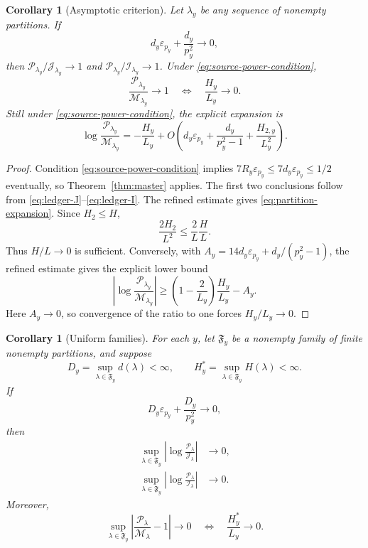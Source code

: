 \documentclass[11pt]{article}
\newtheorem{corollary}[theorem]{Corollary}
\theoremstyle{definition}
\theoremstyle{remark}
\newcommand{\eps}{\varepsilon}
\newcommand{\cP}{\mathcal P}
\newcommand{\cJ}{\mathcal J}
\newcommand{\cI}{\mathcal I}
\newcommand{\cM}{\mathcal M}
\begin{document}
\begin{corollary}[Asymptotic criterion]
\label{cor:criterion}
Let $\lambda_y$ be any sequence of nonempty partitions.  If
\begin{equation}
 d_y\eps_{p_y}+\frac{d_y}{p_y^2}\longrightarrow0,
 \label{eq:source-power-condition}
\end{equation}
then
$\cP_{\lambda_y}/\cJ_{\lambda_y}\to1$ and
$\cP_{\lambda_y}/\cI_{\lambda_y}\to1$.  Under
\eqref{eq:source-power-condition},
\begin{equation}
 \frac{\cP_{\lambda_y}}{\cM_{\lambda_y}}\longrightarrow1
 \quad\Longleftrightarrow\quad
 \frac{H_y}{L_y}\longrightarrow0.
 \label{eq:iff-H}
\end{equation}
Still under \eqref{eq:source-power-condition}, the explicit expansion is
\begin{equation}
 \log\frac{\cP_{\lambda_y}}{\cM_{\lambda_y}}
 =-\frac{H_y}{L_y}
 +O\!\left(d_y\eps_{p_y}+\frac{d_y}{p_y^2-1}
              +\frac{H_{2,y}}{L_y^2}\right).
 \label{eq:partition-expansion}
\end{equation}
\end{corollary}

\begin{proof}
Condition \eqref{eq:source-power-condition} implies
$7R_y\eps_{p_y}\le7d_y\eps_{p_y}\le1/2$ eventually, so
Theorem~\ref{thm:master} applies.  The first two conclusions follow from
\eqref{eq:ledger-J}--\eqref{eq:ledger-I}.  The refined estimate gives
\eqref{eq:partition-expansion}.  Since $H_2\le H$,
\[
 \frac{2H_2}{L^2}\le\frac2L\frac HL.
\]
Thus $H/L\to0$ is sufficient.  Conversely, with
$A_y=14d_y\eps_{p_y}+d_y/(p_y^2-1)$, the refined estimate gives the
explicit lower bound
\[
 \left|\log\frac{\cP_{\lambda_y}}{\cM_{\lambda_y}}\right|
 \ge\left(1-\frac2{L_y}\right)\frac{H_y}{L_y}-A_y.
\]
Here $A_y\to0$, so convergence of the ratio to one forces $H_y/L_y\to0$.
\end{proof}

\begin{corollary}[Uniform families]
\label{cor:uniform-families}
For each $y$, let $\mathfrak F_y$ be a nonempty family of finite nonempty
partitions, and suppose
\[
 D_y=\sup_{\lambda\in\mathfrak F_y}d(\lambda)<\infty,
 \qquad
 H_y^*=\sup_{\lambda\in\mathfrak F_y}H(\lambda)<\infty.
\]
If
\begin{equation}
 D_y\eps_{p_y}+\frac{D_y}{p_y^2}\longrightarrow0,
 \label{eq:uniform-source-power}
\end{equation}
then
\begin{align*}
 \sup_{\lambda\in\mathfrak F_y}
 \left|\log\frac{\cP_\lambda}{\cJ_\lambda}\right|&\longrightarrow0,\\
 \sup_{\lambda\in\mathfrak F_y}
 \left|\log\frac{\cP_\lambda}{\cI_\lambda}\right|&\longrightarrow0.
\end{align*}
Moreover,
\begin{equation}
 \sup_{\lambda\in\mathfrak F_y}
 \left|\frac{\cP_\lambda}{\cM_\lambda}-1\right|\longrightarrow0
 \quad\Longleftrightarrow\quad
 \frac{H_y^*}{L_y}\longrightarrow0.
 \label{eq:uniform-iff}
\end{equation}
\end{corollary}
\end{document}
